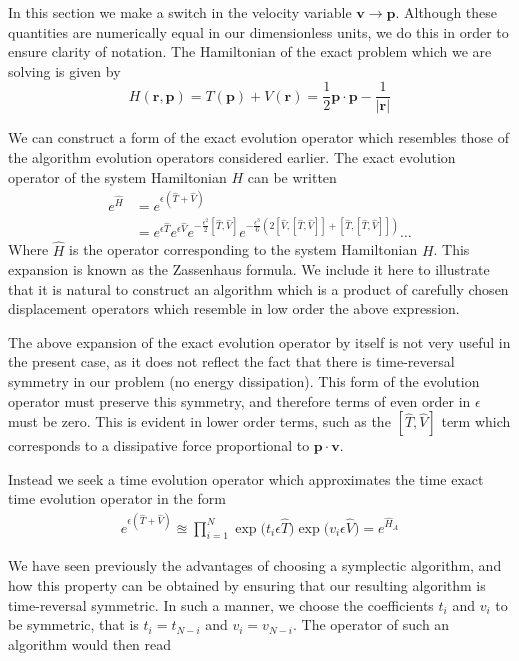 \documentclass[8pt,a4paper]{article}
\begin{document}
	In this section we make a switch in the velocity variable $\mathbf{v}\rightarrow\mathbf{p}$. Although these quantities are numerically equal in our dimensionless units, we do this in order to ensure clarity of notation. The Hamiltonian of the exact problem which we are solving is given by
	\begin{equation}
		H(\mathbf{r}, \mathbf{p}) = T(\mathbf{p}) + V(\mathbf{r}) = \frac{1}{2}\mathbf{p}\cdot\mathbf{p} - \frac{1}{|\mathbf{r}|}
	\end{equation}
	
	We can construct a form of the exact evolution operator which resembles those of the algorithm evolution operators considered earlier. The exact evolution operator of the system Hamiltonian $H$ can be written
	\begin{align}
		e^{\hat{H}} &= e^{\epsilon(\hat{T} + \hat{V})} \\
		&= e^{\epsilon\hat{T}} e^{\epsilon\hat{V}} e^{-\frac{\epsilon^2}{2}[\hat{T},\hat{V}]} e^{-\frac{\epsilon^3}{6}(2[\hat{V},[\hat{T},\hat{V}]] + [\hat{T},[\hat{T},\hat{V}]])} 
		\ldots
	\end{align}
	Where $\hat{H}$ is the operator corresponding to the system Hamiltonian $H$. This expansion is known as the Zassenhaus formula. We include it here to illustrate that it is natural to construct an algorithm which is a product of carefully chosen displacement operators which resemble in low order the above expression.
	
	The above expansion of the exact evolution operator by itself is not very useful in the present case, as it does not reflect the fact that there is time-reversal symmetry in our problem (no energy dissipation). This form of the evolution operator must preserve this symmetry, and therefore terms of even order in $\epsilon$ must be zero. This is evident in lower order terms, such as the $[\hat{T}, \hat{V}]$ term which corresponds to a dissipative force proportional to $\mathbf{p}\cdot\mathbf{v}$.
	
	Instead we seek a time evolution operator which approximates the time exact time evolution operator in the form
	\begin{align}
		e^{\epsilon(\hat{T} + \hat{V})} \approxeq \prod_{i=1}^{N} \exp\Big({t_i \epsilon\hat{T}}\Big) \exp\Big({v_i\epsilon\hat{V}}\Big) = e^{\hat{H}_A}
	\end{align}
	
	We have seen previously the advantages of choosing a symplectic algorithm, and how this property can be obtained by ensuring that our resulting algorithm is time-reversal symmetric. In such a manner, we choose the coefficients $t_i$ and $v_i$ to be symmetric, that is $t_i = t_{N-i}$ and $v_i = v_{N-i}$. The operator of such an algorithm would then read
	
\end{document}
